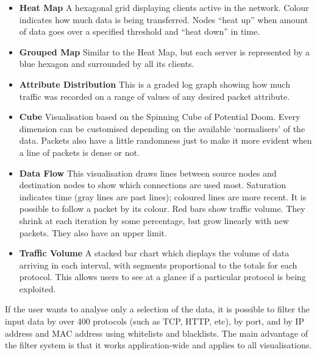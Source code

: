 \documentclass[12pt,a4paper]{article}
\begin{document}
			\begin{itemize}
            
            \item \textbf{Heat Map} A hexagonal grid displaying clients active in the network. Colour indicates how much data is being transferred. Nodes ``heat up'' when amount of data goes over a specified threshold and ``heat down'' in time.

	\item \textbf{Grouped Map} Similar to the Heat Map, but each server is represented by a blue hexagon and surrounded by all its clients.

            \item \textbf{Attribute Distribution} This is a graded log graph showing how much traffic was recorded on a range of values of any desired packet attribute.

            \item \textbf{Cube} Visualisation based on the Spinning Cube of Potential Doom. Every dimension can be customised depending on the available `normalisers' of the data. Packets also have a little randomness just to make it more evident when a line of packets is dense or not.

            \item \textbf{Data Flow} This visualisation draws lines between source nodes and destination nodes to show which connections are used most. Saturation indicates time (gray lines are past lines); coloured lines are more recent. It is possible to follow a packet by its colour. Red bars show traffic volume. They shrink at each iteration by some percentage, but grow linearly with new packets. They also have an upper limit.

            \item \textbf{Traffic Volume} A stacked bar chart which displays the volume of data arriving in each interval, with segments proportional to the totals for each protocol. This allows users to see at a glance if a particular protocol is being exploited.
            
            \end{itemize}
			
			If the user wants to analyse only a selection of the data, it is possible to filter the input data by over 400 protocols (such as TCP, HTTP, etc), by port, and by IP address and MAC address using whitelists and blacklists. The main advantage of the filter system is that it works application-wide and applies to all visualisations.
\end{document}
